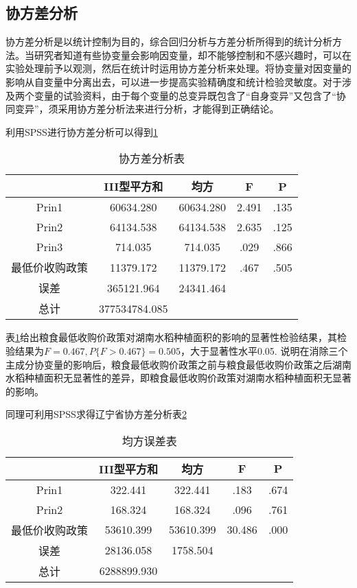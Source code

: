 \documentclass[withoutpreface,bwprint]{cumcmthesis} %
\begin{document}
		\subsection{协方差分析}
协方差分析是以统计控制为目的，综合回归分析与方差分析所得到的统计分析方法。当研究者知道有些协变量会影响因变量，却不能够控制和不感兴趣时，可以在实验处理前予以观测，然后在统计时运用协方差分析来处理。将协变量对因变量的影响从自变量中分离出去，可以进一步提高实验精确度和统计检验灵敏度。对于涉及两个变量的试验资料，由于每个变量的总变异既包含了“自身变异”又包含了“协同变异”，须采用协方差分析法来进行分析，才能得到正确结论。\par
利用SPSS进行协方差分析可以得到\ref{xfc}\par
\begin{table}[htbp]
  \centering
  \caption{协方差分析表}
    \begin{tabular}{ccccc}
    \toprule[2pt]
      &III型平方和 & 均方 & F & P \\
    \midrule[1.5pt]
    Prin1 & 60634.280      & 60634.280 &2.491 & .135  \\
    Prin2  & 64134.538      & 64134.538 & 2.635 & .125  \\
    Prin3 & 714.035     & 714.035 & .029 & .866 \\
    最低价收购政策 & 11379.172      & 11379.172 & .467 & .505 \\
    误差    & 365121.964     & 24341.464 &       &         \\
    总计    & 377534784.085     &       &       &         \\
    \bottomrule[2pt]
    \end{tabular}
  \label{xfc}%
\end{table}%
表\ref{xfc}给出粮食最低收购价政策对湖南水稻种植面积的影响的显著性检验结果，其检验结果为$F=0.467,P\{F>0.467\}=0.505$，大于显著性水平0.05. 说明在消除三个主成分协变量的影响后，粮食最低收购价政策之前与粮食最低收购价政策之后湖南水稻种植面积无显著性的差异，即粮食最低收购价政策对湖南水稻种植面积无显著的影响。\par
同理可利用SPSS求得辽宁省协方差分析表\ref{xfc2}
\begin{table}[htbp]
  \centering
  \caption{均方误差表}
    \begin{tabular}{ccccc}
    \toprule[2pt]
         & III型平方和 &均方& F  & P\\
     \midrule[1.5pt]
    Prin1 & 322.441 & 322.441 & .183 & .674 \\
    Prin2 & 168.324 & 168.324 & .096 & .761 \\
    最低价收购政策 & 53610.399 & 53610.399 & 30.486 &.000\\
    误差    & 28136.058 & 1758.504 &       &  \\
    总计    & 6288899.930 &       &       &  \\
    \bottomrule[2pt]
    \end{tabular}%
  \label{xfc2}%
\end{table}%
\end{document}
